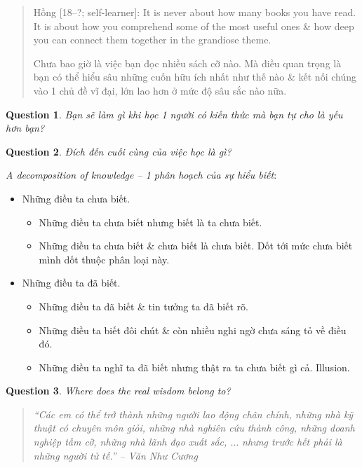 \documentclass[12pt]{article}
\newtheorem{question}{Question}
\begin{document}
\begin{quotation}
	{\sf Hồng [18--?; self-learner]}: It is never about how many books you have read. It is about how you comprehend some of the most useful ones \& how deep you can connect them together in the grandiose theme.
	
	Chưa bao giờ là việc bạn đọc nhiều sách cỡ nào. Mà điều quan trọng là bạn có thể hiểu sâu những cuốn hữu ích nhất như thế nào \& kết nối chúng vào 1 chủ đề vĩ đại, lớn lao hơn ở mức độ sâu sắc nào nữa.
\end{quotation}


\begin{question}
	Bạn sẽ làm gì khi học 1 người có kiến thức mà bạn tự cho là yếu hơn bạn?
\end{question}

\begin{question}
	Đích đến cuối cùng của việc học là gì?
\end{question}

{\it A decomposition of knowledge -- 1 phân hoạch của sự hiểu biết}:
\begin{itemize}
	\item Những điều ta chưa biết.
	\begin{itemize}
		\item Những điều ta chưa biết nhưng biết là ta chưa biết.
		\item Những điều ta chưa biết \& chưa biết là chưa biết. Dốt tới mức chưa biết mình dốt thuộc phân loại này.
	\end{itemize}
	\item Những điều ta đã biết.
	\begin{itemize}
		\item Những điều ta đã biết \& tin tưởng ta đã biết rõ.
		\item Những điều ta biết đôi chút \& còn nhiều nghi ngờ chưa sáng tỏ về điều đó.
		\item Những điều ta nghĩ ta đã biết nhưng thật ra ta chưa biết gì cả. Illusion.
	\end{itemize}
\end{itemize}

\begin{question}
	Where does the real wisdom belong to?
\end{question}

\begin{quotation}\it
	``Các em có thể trở thành những người lao động chân chính, những nhà kỹ thuật có chuyên môn giỏi, những nhà nghiên cứu thành công, những doanh nghiệp tầm cỡ, những nhà lãnh đạo xuất sắc, $\ldots$ nhưng trước hết phải là những người tử tế.'' -- {\sc Văn Như Cương}
\end{quotation}
\end{document}
